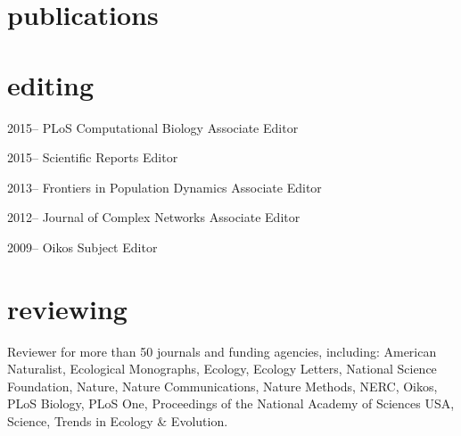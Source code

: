 \documentclass[]{friggeri-cv} %
\begin{document}
\section{publications}
\nocite{*}

\section{editing}
\begin{entrylist}
\entry
{2015--}
{PLoS Computational Biology}
{Associate Editor}{}

\entry
{2015--}
{Scientific Reports}
{Editor}{}

\entry
{2013--}
{Frontiers in Population Dynamics}
{Associate Editor}{}

\entry
{2012--}
{Journal of Complex Networks}
{Associate Editor}{}

\entry
{2009--}
{Oikos}
{Subject Editor}{}

\end{entrylist}

\section{reviewing}
Reviewer for more than 50 journals and funding agencies, including:
American Naturalist, Ecological Monographs,
Ecology, Ecology Letters, National Science Foundation, Nature, Nature
Communications, Nature Methods, NERC, Oikos, PLoS Biology, PLoS One,
Proceedings of the National Academy of Sciences USA, Science, Trends in Ecology \&
Evolution.
\end{document}
